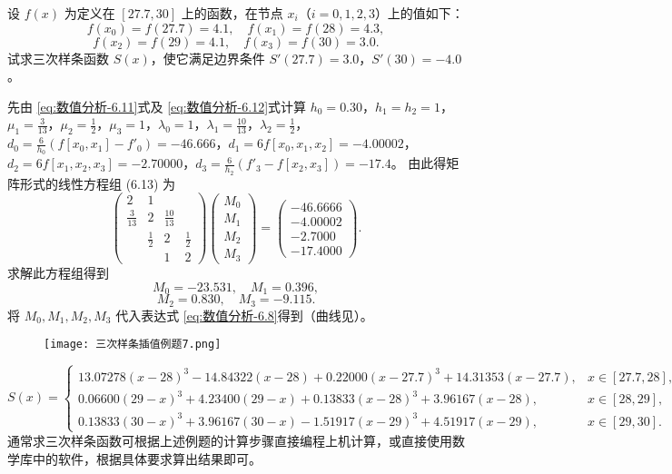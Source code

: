 \documentclass[../../main.tex]{subfiles}
\begin{document}
\begin{example}
设 $f(x)$ 为定义在 $[27.7,30]$ 上的函数，在节点 $x_i$（$i=0,1,2,3$）上的值如下：
$$f(x_0)=f(27.7)=4.1, \quad f(x_1)=f(28)=4.3,$$
$$f(x_2)=f(29)=4.1, \quad f(x_3)=f(30)=3.0.$$
试求三次样条函数 $S(x)$，使它满足边界条件 $S'(27.7)=3.0$，$S'(30)=-4.0$。
\end{example}
\begin{solution}
先由 \eqref{eq:数值分析-6.11}式及 \eqref{eq:数值分析-6.12}式计算 $h_0=0.30$，$h_1=h_2=1$，$\mu_1=\frac{3}{13}$，$\mu_2=\frac{1}{2}$，$\mu_3=1$，$\lambda_0=1$，$\lambda_1=\frac{10}{13}$，$\lambda_2=\frac{1}{2}$，$d_0=\frac{6}{h_0}(f[x_0,x_1]-f'_0)=-46.666$，$d_1=6f[x_0,x_1,x_2]=-4.00002$，$d_2=6f[x_1,x_2,x_3]=-2.70000$，$d_3=\frac{6}{h_2}(f'_3-f[x_2,x_3])=-17.4$。
由此得矩阵形式的线性方程组 (6.13) 为
$$\begin{pmatrix}
2 & 1 & & \\
\frac{3}{13} & 2 & \frac{10}{13} & \\
& \frac{1}{2} & 2 & \frac{1}{2} \\
& & 1 & 2
\end{pmatrix}
\begin{pmatrix}
M_0 \\
M_1 \\
M_2 \\
M_3
\end{pmatrix}
=
\begin{pmatrix}
-46.6666 \\
-4.00002 \\
-2.7000 \\
-17.4000
\end{pmatrix}.$$
求解此方程组得到
$$M_0=-23.531, \quad M_1=0.396,$$
$$M_2=0.830, \quad M_3=-9.115.$$
将 $M_0,M_1,M_2,M_3$ 代入表达式 \eqref{eq:数值分析-6.8}得到（曲线见）。
\begin{figure}[H]
\centering
\texttt{[image: 三次样条插值例题7.png]}
\caption{}
\label{figure:三次样条插值例题7}
\end{figure}
$$
S(x)=
\begin{cases}
13.07278(x-28)^3 - 14.84322(x-28) + 0.22000(x-27.7)^3 + 14.31353(x-27.7), & x \in [27.7,28], \\
0.06600(29-x)^3 + 4.23400(29-x) + 0.13833(x-28)^3 + 3.96167(x-28), & x \in [28,29], \\
0.13833(30-x)^3 + 3.96167(30-x) - 1.51917(x-29)^3 + 4.51917(x-29), & x \in [29,30].
\end{cases}
$$
通常求三次样条函数可根据上述例题的计算步骤直接编程上机计算，或直接使用数学库中的软件，根据具体要求算出结果即可。

\end{solution}
\end{document}
